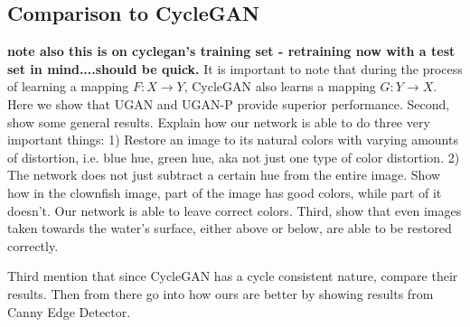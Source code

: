 \documentclass[conference,reqno]{IEEEtran}
\begin{document}
\subsection{Comparison to CycleGAN}
\textbf{note also this is on cyclegan's training set - retraining now with a test set in mind....should be quick.}
It is important to note that during the process of learning a mapping $F: X \rightarrow Y$, CycleGAN also learns a
mapping $G: Y \rightarrow X$. Here we show that UGAN and UGAN-P provide superior performance.
Second, show some general results. Explain how our network is able to do three very important things: 1) Restore an
image to its natural colors with varying amounts of distortion, i.e. blue hue, green hue, aka not just one type of
color distortion. 2) The network does not just subtract a certain hue from the entire image. Show how in the clownfish
image, part of the image has good colors, while part of it doesn't. Our network is able to leave correct colors. Third,
show that even images taken towards the water's surface, either above or below, are able to be restored correctly.

Third mention that since CycleGAN has a cycle consistent nature, compare their results. Then from there go into how
ours are better by showing results from Canny Edge Detector.
\end{document}
